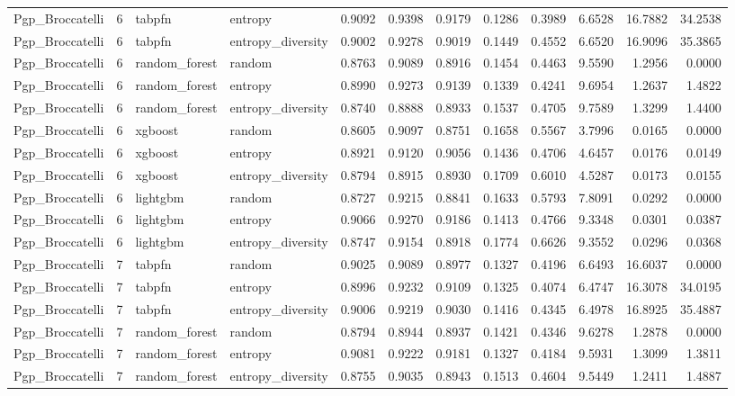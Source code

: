 \begin{tabular}{lrllrrrrrrrr}
Pgp_Broccatelli & 6 & tabpfn & entropy & 0.9092 & 0.9398 & 0.9179 & 0.1286 & 0.3989 & 6.6528 & 16.7882 & 34.2538 \\
Pgp_Broccatelli & 6 & tabpfn & entropy_diversity & 0.9002 & 0.9278 & 0.9019 & 0.1449 & 0.4552 & 6.6520 & 16.9096 & 35.3865 \\
Pgp_Broccatelli & 6 & random_forest & random & 0.8763 & 0.9089 & 0.8916 & 0.1454 & 0.4463 & 9.5590 & 1.2956 & 0.0000 \\
Pgp_Broccatelli & 6 & random_forest & entropy & 0.8990 & 0.9273 & 0.9139 & 0.1339 & 0.4241 & 9.6954 & 1.2637 & 1.4822 \\
Pgp_Broccatelli & 6 & random_forest & entropy_diversity & 0.8740 & 0.8888 & 0.8933 & 0.1537 & 0.4705 & 9.7589 & 1.3299 & 1.4400 \\
Pgp_Broccatelli & 6 & xgboost & random & 0.8605 & 0.9097 & 0.8751 & 0.1658 & 0.5567 & 3.7996 & 0.0165 & 0.0000 \\
Pgp_Broccatelli & 6 & xgboost & entropy & 0.8921 & 0.9120 & 0.9056 & 0.1436 & 0.4706 & 4.6457 & 0.0176 & 0.0149 \\
Pgp_Broccatelli & 6 & xgboost & entropy_diversity & 0.8794 & 0.8915 & 0.8930 & 0.1709 & 0.6010 & 4.5287 & 0.0173 & 0.0155 \\
Pgp_Broccatelli & 6 & lightgbm & random & 0.8727 & 0.9215 & 0.8841 & 0.1633 & 0.5793 & 7.8091 & 0.0292 & 0.0000 \\
Pgp_Broccatelli & 6 & lightgbm & entropy & 0.9066 & 0.9270 & 0.9186 & 0.1413 & 0.4766 & 9.3348 & 0.0301 & 0.0387 \\
Pgp_Broccatelli & 6 & lightgbm & entropy_diversity & 0.8747 & 0.9154 & 0.8918 & 0.1774 & 0.6626 & 9.3552 & 0.0296 & 0.0368 \\
Pgp_Broccatelli & 7 & tabpfn & random & 0.9025 & 0.9089 & 0.8977 & 0.1327 & 0.4196 & 6.6493 & 16.6037 & 0.0000 \\
Pgp_Broccatelli & 7 & tabpfn & entropy & 0.8996 & 0.9232 & 0.9109 & 0.1325 & 0.4074 & 6.4747 & 16.3078 & 34.0195 \\
Pgp_Broccatelli & 7 & tabpfn & entropy_diversity & 0.9006 & 0.9219 & 0.9030 & 0.1416 & 0.4345 & 6.4978 & 16.8925 & 35.4887 \\
Pgp_Broccatelli & 7 & random_forest & random & 0.8794 & 0.8944 & 0.8937 & 0.1421 & 0.4346 & 9.6278 & 1.2878 & 0.0000 \\
Pgp_Broccatelli & 7 & random_forest & entropy & 0.9081 & 0.9222 & 0.9181 & 0.1327 & 0.4184 & 9.5931 & 1.3099 & 1.3811 \\
Pgp_Broccatelli & 7 & random_forest & entropy_diversity & 0.8755 & 0.9035 & 0.8943 & 0.1513 & 0.4604 & 9.5449 & 1.2411 & 1.4887 \\

\end{tabular}
